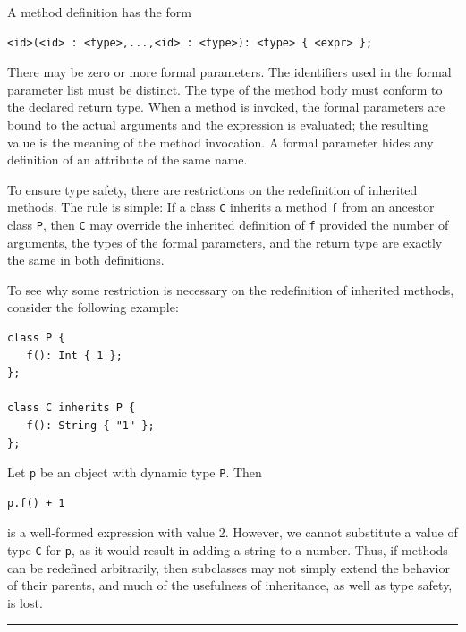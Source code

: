 \documentclass[]{article}
\begin{document}
A method definition has the form

\begin{verbatim}
<id>(<id> : <type>,...,<id> : <type>): <type> { <expr> };
\end{verbatim}

There may be zero or more formal parameters. The identifiers used in the
formal parameter list must be distinct. The type of the method body must
conform to the declared return type. When a method is invoked, the
formal parameters are bound to the actual arguments and the expression
is evaluated; the resulting value is the meaning of the method
invocation. A formal parameter hides any definition of an attribute of
the same name.

To ensure type safety, there are restrictions on the redefinition of
inherited methods. The rule is simple: If a class \texttt{C} inherits a
method \texttt{f} from an ancestor class \texttt{P}, then \texttt{C} may
override the inherited definition of \texttt{f} provided the number of
arguments, the types of the formal parameters, and the return type are
exactly the same in both definitions.

To see why some restriction is necessary on the redefinition of
inherited methods, consider the following example:

\begin{verbatim}
class P {
   f(): Int { 1 };
};

class C inherits P {
   f(): String { "1" };
};
\end{verbatim}

Let \texttt{p} be an object with dynamic type \texttt{P}. Then

\begin{verbatim}
p.f() + 1
\end{verbatim}

is a well-formed expression with value 2. However, we cannot substitute
a value of type \texttt{C} for \texttt{p}, as it would result in adding
a string to a number. Thus, if methods can be redefined arbitrarily,
then subclasses may not simply extend the behavior of their parents, and
much of the usefulness of inheritance, as well as type safety, is lost.

\begin{center}\rule{3in}{0.4pt}\end{center}
\end{document}

